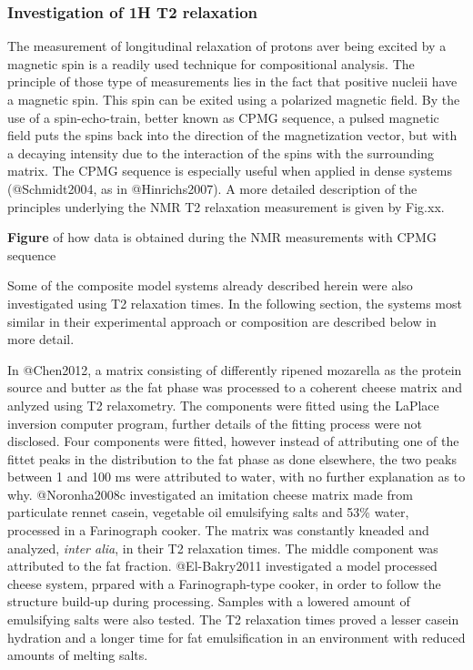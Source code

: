 \documentclass[
]{article}
\begin{document}
\subsubsection{Investigation of 1H T2 relaxation}

The measurement of longitudinal relaxation of protons aver being excited
by a magnetic spin is a readily used technique for compositional
analysis. The principle of those type of measurements lies in the fact
that positive nucleii have a magnetic spin. This spin can be exited
using a polarized magnetic field. By the use of a spin-echo-train,
better known as CPMG sequence, a pulsed magnetic field puts the spins
back into the direction of the magnetization vector, but with a decaying
intensity due to the interaction of the spins with the surrounding
matrix. The CPMG sequence is especially useful when applied in dense
systems (@Schmidt2004, as in @Hinrichs2007). A more detailed description
of the principles underlying the NMR T2 relaxation measurement is given
by Fig.xx.

\textbf{Figure} of how data is obtained during the NMR measurements with
CPMG sequence

Some of the composite model systems already described herein were also
investigated using T2 relaxation times. In the following section, the
systems most similar in their experimental approach or composition are
described below in more detail.

In @Chen2012, a matrix consisting of differently ripened mozarella as
the protein source and butter as the fat phase was processed to a
coherent cheese matrix and anlyzed using T2 relaxometry. The components
were fitted using the LaPlace inversion computer program, further
details of the fitting process were not disclosed. Four components were
fitted, however instead of attributing one of the fittet peaks in the
distribution to the fat phase as done elsewhere, the two peaks between 1
and 100 ms were attributed to water, with no further explanation as to
why. @Noronha2008c investigated an imitation cheese matrix made from
particulate rennet casein, vegetable oil emulsifying salts and 53\%
water, processed in a Farinograph cooker. The matrix was constantly
kneaded and analyzed, \emph{inter alia}, in their T2 relaxation times.
The middle component was attributed to the fat fraction. @El-Bakry2011
investigated a model processed cheese system, prpared with a
Farinograph-type cooker, in order to follow the structure build-up
during processing. Samples with a lowered amount of emulsifying salts
were also tested. The T2 relaxation times proved a lesser casein
hydration and a longer time for fat emulsification in an environment
with reduced amounts of melting salts.
\end{document}
